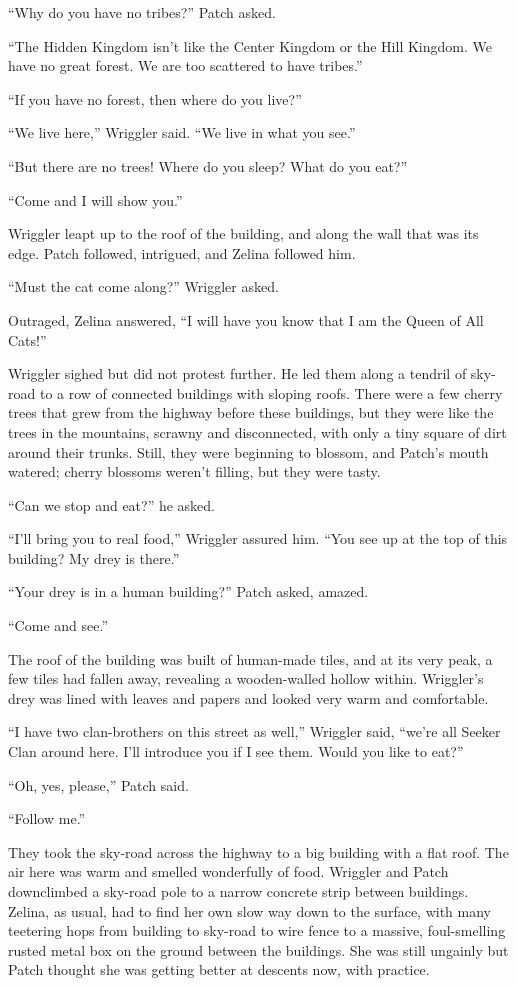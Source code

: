 \documentclass[12pt]{memoir}
\begin{document}
“Why do you have no tribes?” Patch asked.

“The Hidden Kingdom isn’t like the Center Kingdom or the Hill
Kingdom. We have no great forest. We are too scattered to have
tribes.”

“If you have no forest, then where do you live?”

“We live here,” Wriggler said. “We live in what you see.”

“But there are no trees! Where do you sleep? What do you eat?”

“Come and I will show you.”

Wriggler leapt up to the roof of the building, and along the wall that
was its edge. Patch followed, intrigued, and Zelina followed him.

“Must the cat come along?” Wriggler asked.

Outraged, Zelina answered, “I will have you know that I am the Queen
of All Cats!”

Wriggler sighed but did not protest further. He led them along a
tendril of sky-road to a row of connected buildings with sloping
roofs. There were a few cherry trees that grew from the highway before
these buildings, but they were like the trees in the mountains,
scrawny and disconnected, with only a tiny square of dirt around their
trunks. Still, they were beginning to blossom, and Patch’s mouth
watered; cherry blossoms weren’t filling, but they were tasty.

“Can we stop and eat?” he asked.

“I’ll bring you to real food,” Wriggler assured him. “You see up at
the top of this building? My drey is there.”

“Your drey is in a human building?” Patch asked, amazed.

“Come and see.”

The roof of the building was built of human-made tiles, and at its
very peak, a few tiles had fallen away, revealing a wooden-walled
hollow within. Wriggler’s drey was lined with leaves and papers and
looked very warm and comfortable.

“I have two clan-brothers on this street as well,” Wriggler said,
“we’re all Seeker Clan around here. I’ll introduce you if I see
them. Would you like to eat?”

“Oh, yes, please,” Patch said.

“Follow me.”

They took the sky-road across the highway to a big building with a
flat roof. The air here was warm and smelled wonderfully of
food. Wriggler and Patch downclimbed a sky-road pole to a narrow
concrete strip between buildings. Zelina, as usual, had to find her
own slow way down to the surface, with many teetering hops from
building to sky-road to wire fence to a massive, foul-smelling rusted
metal box on the ground between the buildings. She was still ungainly
but Patch thought she was getting better at descents now, with
practice.
\end{document}
